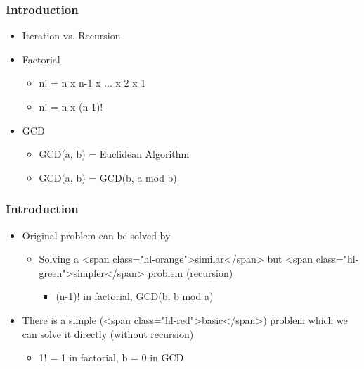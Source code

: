 \documentclass{../c-lecture}
\begin{document}
\begin{frame}
  \frametitle{Introduction}
  \begin{itemize}
    \item Iteration vs. Recursion
    \item Factorial
    \begin{itemize}
      \item n! = n x n-1 x ... x 2 x 1
      \item n! = n x (n-1)!
    \end{itemize}
    \item GCD
    \begin{itemize}
      \item GCD(a, b) = Euclidean Algorithm
      \item GCD(a, b) = GCD(b, a mod b)
    \end{itemize}
  \end{itemize}
\end{frame}

\begin{frame}
  \frametitle{Introduction}
  \begin{itemize}
    \item Original problem can be solved by
    \begin{itemize}
      \item
        Solving a <span class="hl-orange">similar</span> but
        <span class="hl-green">simpler</span> problem (recursion)

      \begin{itemize}
        \item (n-1)! in factorial, GCD(b, b mod a)
      \end{itemize}
    \end{itemize}
    \item
      There is a simple (<span class="hl-red">basic</span>) problem which we can
      solve it directly (without recursion)

    \begin{itemize}
      \item 1! = 1 in factorial, b = 0 in GCD
    \end{itemize}
  \end{itemize}
\end{frame}
\end{document}
